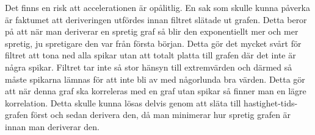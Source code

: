{Det finns en risk att accelerationen är opålitlig. En sak som skulle kunna påverka är faktumet att deriveringen utfördes innan filtret slätade ut grafen. Detta beror på att när man deriverar en spretig graf så blir den exponentiellt mer och mer spretig, ju spretigare den var från första början. Detta gör det mycket svårt för filtret att tona ned alla spikar utan att totalt platta till grafen där det inte är några spikar. Filtret tar inte så stor hänsyn till extremvärden och därmed så måste spikarna lämnas för att inte bli av med någorlunda bra värden. Detta gör att när denna graf ska korreleras med en graf utan spikar så finner man en lägre korrelation. Detta skulle kunna lösas delvis genom att släta till hastighet-tids-grafen först och sedan derivera den, då man minimerar hur spretig grafen är innan man deriverar den.

}


